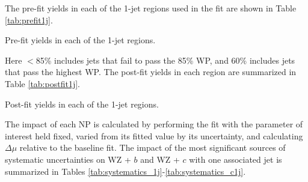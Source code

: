 The pre-fit yields in each of the 1-jet regions used in the fit are shown in Table \ref{tab:prefit1j}.

\hspace{-1in}\begin{table}[H]
\begin{adjustwidth}{-3em}{-3em}
\small

\caption{Pre-fit yields in each of the 1-jet regions.}
\label{tab:prefit1j}
\end{adjustwidth}
\end{table}

Here $<$85\% includes jets that fail to pass the 85\% WP, and 60\% includes jets that pass the highest WP. The post-fit yields in each region are summarized in Table \ref{tab:postfit1j}.

\hspace{-1in}\begin{table}[H]
\begin{adjustwidth}{-3em}{-3em}
\small

\caption{Post-fit yields in each of the 1-jet regions.}                                                                 
\label{tab:postfit1j}
\end{adjustwidth} 
\end{table}

The impact of each NP is calculated by performing the fit with the parameter of interest held fixed, varied from its fitted value by its uncertainty, and calculating $\Delta\mu$ relative to the baseline fit.  The impact of the most significant sources of systematic uncertainties on WZ + $b$ and WZ + $c$ with one associated jet is summarized in Tables \ref{tab:systematics_1j}-\ref{tab:systematics_c1j}. 

